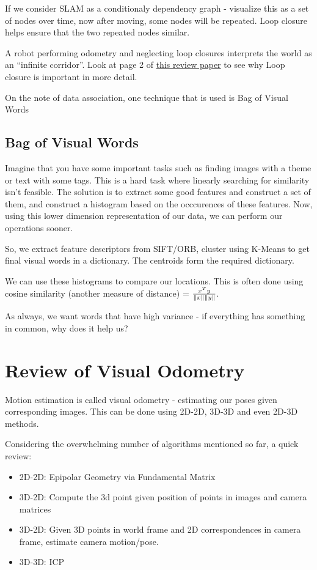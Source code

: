 If we consider SLAM as a conditionaly dependency graph - visualize this as a set of nodes over time, now after moving, some nodes will be repeated. Loop closure helps ensure that the two repeated nodes similar.

A  robot  performing  odometry  and  neglecting  loop closures interprets the world as an “infinite corridor”. Look at page 2 of \href{https://arxiv.org/pdf/1606.05830.pdf#page=3&zoom=110,106,607}{this review paper} to see why Loop closure is important in more detail.

On the note of data association, one technique that is used is Bag of Visual Words

\subsection{Bag of Visual Words}

Imagine that you have some important tasks such as finding images with a theme or text with some tags. This is a hard task where linearly searching for similarity isn't feasible. The solution is to extract some good features and construct a set of them, and construct a histogram based on the occcurences of these features. Now, using this lower dimension representation of our data, we can perform our operations sooner.

So, we extract feature descriptors from SIFT/ORB, cluster using K-Means to get final visual words in a dictionary. The centroids form the required dictionary.

We can use these histograms to compare our locations. This is often done using cosine similarity (another measure of distance) = $\frac{x^Ty}{\left\lVert x\right\rVert\left\lVert y\right\rVert}$.

As always, we want words that have high variance - if everything has something in common, why does it help us? 

\section{Review of Visual Odometry}

Motion estimation is called visual odometry - estimating our poses given corresponding images. This can be done using 2D-2D, 3D-3D and even 2D-3D methods.

Considering the overwhelming number of algorithms mentioned so far, a quick review:

\begin{itemize}
    \item 2D-2D: Epipolar Geometry via Fundamental Matrix
    \item 3D-2D: Compute the 3d point given position of points in images and camera matrices
    \item 3D-2D: Given 3D points in world frame and 2D correspondences in camera frame, estimate camera motion/pose.
    \item 3D-3D: ICP
\end{itemize}

